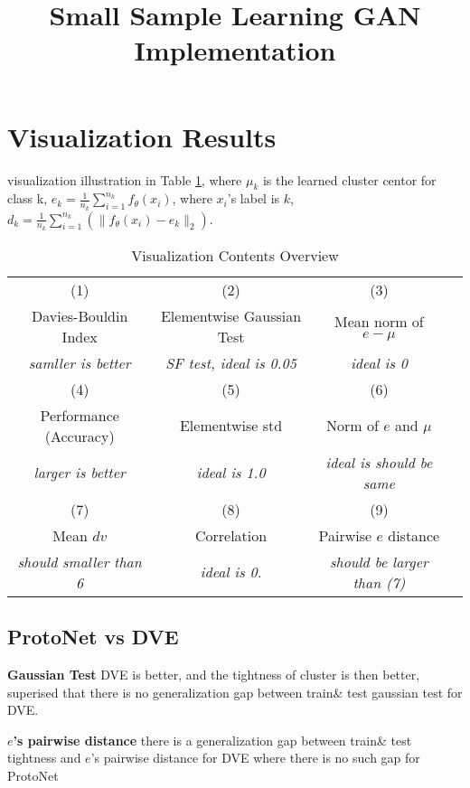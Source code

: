 \documentclass{article}
\title{Small Sample Learning GAN Implementation}
\author{}
\begin{document}
\maketitle

\section{Visualization Results}

visualization illustration in Table \ref{tb:vis-content}, where $\mu_k$ is the learned cluster centor for class k, $e_k = \frac{1}{n_k}\sum_{i=1}^{n_k} {f_\theta(x_i)}$, where $x_i$'s label is $k$, $d_k = \frac{1}{n_k}\sum_{i=1}^{n_k} (\|f_\theta(x_i)-e_k\|_2)$.

\begin{table}[!htbp]
\centering
\caption{Visualization Contents Overview}\label{tb:vis-content}
\begin{tabular}{cccc}
\toprule
(1) & (2) & (3) \\
Davies-Bouldin Index & Elementwise Gaussian Test & Mean norm of $e-\mu$ \\
\emph{samller is better}  & \emph{SF test, ideal is 0.05}  & \emph{ideal is 0} \\ 
\midrule
(4) & (5) & (6) \\
Performance (Accuracy) & Elementwise std  &  Norm of $e$ and $\mu$ \\
\emph{larger is better}  & \emph{ideal is 1.0}  & \emph{ideal is should be same} \\ 
\midrule
(7) & (8) & (9) \\
Mean $dv$ & Correlation & Pairwise $e$ distance \\
\emph{should smaller than 6} & \emph{ideal is 0.} & \emph{should be larger than (7)}\\
\bottomrule
\end{tabular}
\end{table}

\subsection{ProtoNet vs DVE}

\noindent \textbf{Gaussian Test} DVE is better, and the tightness of cluster is then better, superised that there is no generalization gap between train\& test gaussian test for DVE.

\noindent \textbf{$e$'s pairwise distance} there is a generalization gap between train\& test tightness and $e$'s pairwise distance for DVE where there is no such gap for ProtoNet
\end{document}
